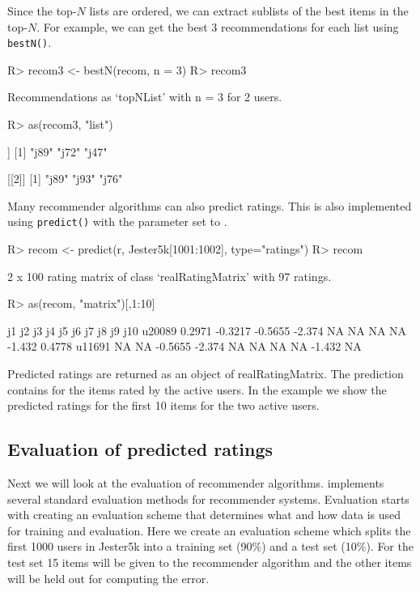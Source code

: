 \documentclass[nojss]{jss}
\newcommand{\class}[1]{\mbox{\textsf{#1}}}
\newcommand{\func}[1]{\mbox{\texttt{#1()}}}
\begin{document}
Since the top-$N$ lists are ordered, we can extract sublists of
the best items in the top-$N$. For example, we can get the best 3 
recommendations for each list using \func{bestN}.
\begin{Schunk}
\begin{Sinput}
R> recom3 <- bestN(recom, n = 3)
R> recom3
\end{Sinput}
\begin{Soutput}
Recommendations as ‘topNList’ with n = 3 for 2 users. 
\end{Soutput}
\begin{Sinput}
R> as(recom3, "list")
\end{Sinput}
\begin{Soutput}
[[1]]
[1] "j89" "j72" "j47"

[[2]]
[1] "j89" "j93" "j76"
\end{Soutput}
\end{Schunk}


Many recommender algorithms can also predict ratings. This is also
implemented using \func{predict} with the parameter 
set to .

\begin{Schunk}
\begin{Sinput}
R> recom <- predict(r, Jester5k[1001:1002], type="ratings")
R> recom
\end{Sinput}
\begin{Soutput}
2 x 100 rating matrix of class ‘realRatingMatrix’ with 97 ratings.
\end{Soutput}
\begin{Sinput}
R> as(recom, "matrix")[,1:10]
\end{Sinput}
\begin{Soutput}
           j1      j2      j3     j4 j5 j6 j7 j8     j9    j10
u20089 0.2971 -0.3217 -0.5655 -2.374 NA NA NA NA -1.432 0.4778
u11691     NA      NA -0.5655 -2.374 NA NA NA NA -1.432     NA
\end{Soutput}
\end{Schunk}

Predicted ratings are returned as an object of \class{realRatingMatrix}.
The prediction contains  for the items rated by the active users.
In the example we show the predicted ratings for the first 10 items for
the two active users.

\subsection{Evaluation of predicted ratings}
Next we will look at the evaluation of recommender algorithms.
 implements several 
standard evaluation methods for recommender systems. 
Evaluation starts with creating an evaluation scheme
that determines what and how data is used for training and evaluation.
Here we create an evaluation scheme which splits the first 1000 users
in Jester5k into a training set (90\%) and a test set (10\%). For 
the test set 15 items will be given to the recommender algorithm 
and the other items will be held out
for computing the error.
\end{document}

